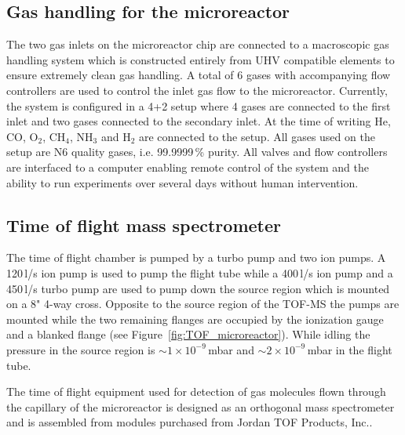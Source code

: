 \documentclass[aip,rsi]{revtex4-1}
\begin{document}
\subsection{Gas handling for the microreactor}
The two gas inlets on the microreactor chip are connected to a macroscopic gas handling system which is constructed entirely from UHV compatible elements to ensure extremely clean gas handling. A total of 6 gases with accompanying flow controllers are used to control the inlet gas flow to the microreactor. Currently, the system is configured in a 4+2 setup where 4 gases are connected to the first inlet and two gases connected to the secondary inlet. At the time of writing He, CO, O$_2$, CH$_4$, NH$_3$ and H$_2$ are connected to the setup. All gases used on the setup are N6 quality gases, i.e. 99.9999\,\% purity. All valves and flow controllers are interfaced to a computer enabling remote control of the system and the ability to run experiments over several days without human intervention.

\subsection{Time of flight mass spectrometer}
The time of flight chamber is pumped by a turbo pump and two ion pumps. A 120\,l/s ion pump is used to pump the flight tube while a 400\,l/s ion pump and a 450\,l/s turbo pump are used to pump down the source region which is mounted on a 8" 4-way cross. Opposite to the source region of the TOF-MS the pumps are mounted while the two remaining flanges are occupied by the ionization gauge and a blanked flange (see Figure~\ref{fig:TOF_microreactor}). While idling the pressure in the source region is $\sim1\times10^{-9}$\,mbar and $\sim2\times10^{-9}$\,mbar in the flight tube.

The time of flight equipment used for detection of gas molecules flown through the capillary of the microreactor is designed as an orthogonal mass spectrometer and is assembled from modules purchased from Jordan TOF Products, Inc.\cite{JordanHomepage}. 
\end{document}
